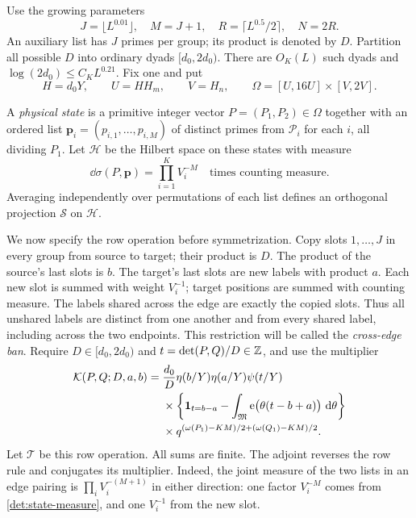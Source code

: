 Use the growing parameters
\begin{equation}\label{det:moment-parameters}
 J=\lfloor L^{0.01}\rfloor,\quad M=J+1,\quad
 R=\lceil L^{0.5}/2\rceil,\quad N=2R.
\end{equation}
An auxiliary list has $J$ primes per group; its product is denoted
by $D$.  Partition all possible $D$ into ordinary dyads
$[d_0,2d_0)$.  There are $O_K(L)$ such dyads and
$\log(2d_0)\leq C_KL^{0.21}$.  Fix one and put
\begin{equation}\label{det:physical-box}
 H=d_0Y,\qquad U=HH_m,\qquad V=H_n,\qquad
 \Omega=[U,16U]\times[V,2V].
\end{equation}

A \emph{physical state} is a primitive integer vector
$P=(P_1,P_2)\in\Omega$ together with an ordered list
$\boldsymbol p_i=(p_{i,1},\ldots,p_{i,M})$ of distinct primes
from $\mathcal P_i$ for each $i$, all dividing $P_1$.
Let $\mathcal H$ be the Hilbert space on these states with measure
\begin{equation}\label{det:state-measure}
 \dd\sigma(P,\boldsymbol p)=\prod_{i=1}^KV_i^{-M}
 \quad\text{times counting measure}.
\end{equation}
Averaging independently over permutations of each list defines an
orthogonal projection $\mathcal S$ on $\mathcal H$.

We now specify the row operation before symmetrization.  Copy slots
$1,\ldots,J$ in every group from source to target; their product
is $D$.  The product of the source's last slots is $b$.  The
target's last slots are new labels with product $a$.  Each new
slot is summed with weight $V_i^{-1}$; target positions are summed
with counting measure.  The labels shared across the edge are
exactly the copied slots.  Thus all unshared labels are distinct
from one another and from every shared label, including across
the two endpoints.  This restriction will be called the
\emph{cross-edge ban}.  Require $D\in[d_0,2d_0)$ and
$t=\det(P,Q)/D\in\mathbb Z$, and use the multiplier
\begin{equation}\label{eq:det-kernel}
 \begin{split}
 \mathcal K(P,Q;D,a,b)={}&\frac{d_0}{D}
       \eta(b/Y)\eta(a/Y)\psi(t/Y)\\
 &\times\left\{\mathbf{1}_{t=b-a}
       -\int_{\mathfrak M}\mathrm{e}\bigl(\theta(t-b+a)\bigr)
                    \,\,\mathrm d\theta\right\}\\
 &\times q^{(\omega(P_1)-KM)/2+(\omega(Q_1)-KM)/2}.
 \end{split}
\end{equation}
Let $\mathcal T$ be this row operation. All sums are finite.
The adjoint reverses the row rule and
conjugates its multiplier.  Indeed, the joint measure of the two
lists in an edge pairing is $\prod_iV_i^{-(M+1)}$ in either
direction: one factor $V_i^{-M}$ comes from
\eqref{det:state-measure}, and one $V_i^{-1}$ from the new slot.


